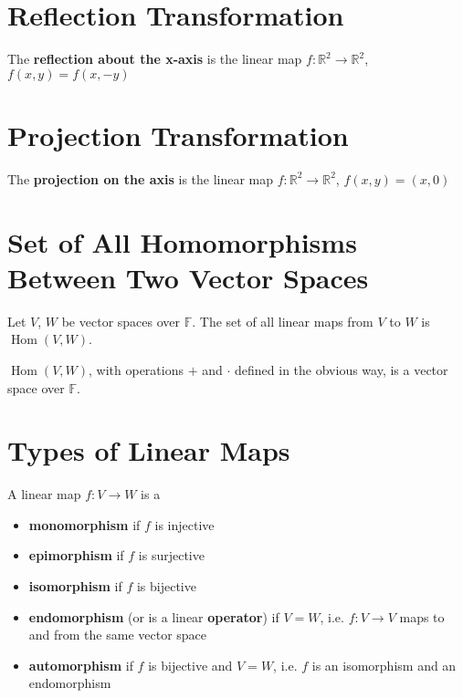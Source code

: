 \documentclass[letterpaper,12pt]{article}
\begin{document}
\section*{Reflection Transformation}
\begin{example}
The \textbf{reflection about the x-axis} is the linear map $f: \mathbb{R}^2 \rightarrow \mathbb{R}^2$, $f(x,y) = f(x,-y)$
\end{example}

\section*{Projection Transformation}
\begin{example}
The \textbf{projection on the axis} is the linear map $f: \mathbb{R}^2 \rightarrow \mathbb{R}^2$, $f(x,y) = (x,0)$
\end{example}

\section*{Set of All Homomorphisms Between Two Vector Spaces}
\begin{definition}
Let $V$, $W$ be vector spaces over $\mathbb{F}$. The set of all linear maps from $V$ to $W$ is $\operatorname{Hom}(V, W)$.
\end{definition}

\begin{corollary}
$\operatorname{Hom}(V, W)$, with operations $+$ and $\cdot$ defined in the obvious way, is a vector space over $\mathbb{F}$.
\end{corollary}

\section*{Types of Linear Maps}
\begin{definition}
A linear map $f: V \rightarrow W$ is a
\begin{itemize}
    \item \textbf{monomorphism} if $f$ is injective
    \item \textbf{epimorphism} if $f$ is surjective
    \item \textbf{isomorphism} if $f$ is bijective
    \item \textbf{endomorphism} (or is a linear \textbf{operator}) if $V = W$, i.e. $f: V \rightarrow V$ maps to and from the same vector space
    \item \textbf{automorphism} if $f$ is bijective and $V = W$, i.e. $f$ is an isomorphism and an endomorphism
\end{itemize}
\end{definition}
\end{document}
